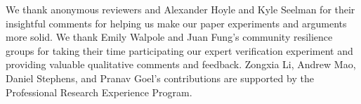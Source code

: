 We thank anonymous reviewers and Alexander Hoyle and Kyle Seelman for their insightful comments for helping us make our paper experiments and arguments more solid. We thank Emily Walpole and Juan Fung's community resilience groups for taking their time participating our expert verification experiment and providing valuable qualitative comments and feedback. Zongxia Li, Andrew Mao, Daniel Stephens, and Pranav Goel's contributions are supported by the  Professional Research Experience Program. 